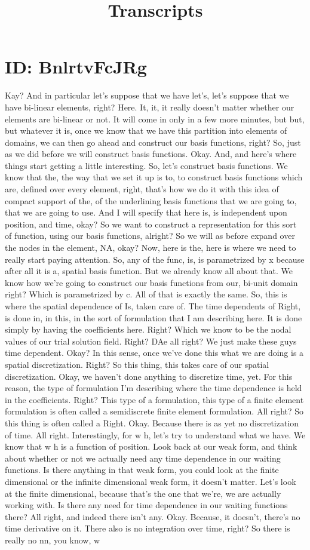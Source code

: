 \documentclass[10pt]{article}
\title{Transcripts}
\date{}
\begin{document}
\section*{ID: BnlrtvFcJRg}
Kay? And in particular let's suppose that we have let's, let's suppose that we have bi-linear elements, right? Here. It, it, it really doesn't matter whether our elements are bi-linear or not. It will come in only in a few more minutes, but but, but whatever it is, once we know that we have this partition into elements of domains, we can then go ahead and construct our basis functions, right? So, just as we did before we will construct basis functions. Okay. And, and here's where things start getting a little interesting. So, let's construct basis functions. We know that the, the way that we set it up is to, to construct basis functions which are, defined over every element, right, that's how we do it with this idea of compact support of the, of the underlining basis functions that we are going to, that we are going to use. And I will specify that here is, is independent upon position, and time, okay? So we want to construct a representation for this sort of function, using our basis functions, alright? So we will as before expand over the nodes in the element, NA, okay? Now, here is the, here is where we need to really start paying attention. So, any of the func, is, is parametrized by x because after all it is a, spatial basis function. But we already know all about that. We know how we're going to construct our basis functions from our, bi-unit domain right? Which is parametrized by c. All of that is exactly the same. So, this is where the spatial dependence of Is, taken care of. The time dependents of Right, is done in, in this, in the sort of formulation that I am describing here. It is done simply by having the coefficients here. Right? Which we know to be the nodal values of our trial solution field. Right? DAe all right? We just make these guys time dependent. Okay? In this sense, once we've done this what we are doing is a spatial discretization. Right? So this thing, this takes care of our spatial discretization. Okay, we haven't done anything to discretize time, yet. For this reason, the type of formulation I'm describing where the time dependence is held in the coefficients. Right? This type of a formulation, this type of a finite element formulation is often called a semidiscrete finite element formulation. All right? So this thing is often called a Right. Okay. Because there is as yet no discretization of time. All right. Interestingly, for w h, let's try to understand what we have. We know that w h is a function of position. Look back at our weak form, and think about whether or not we actually need any time dependence in our waiting functions. Is there anything in that weak form, you could look at the finite dimensional or the infinite dimensional weak form, it doesn't matter. Let's look at the finite dimensional, because that's the one that we're, we are actually working with. Is there any need for time dependence in our waiting functions there? All right, and indeed there isn't any. Okay. Because, it doesn't, there's no time derivative on it. There also is no integration over time, right? So there is really no nn, you know, w 
\end{document}
